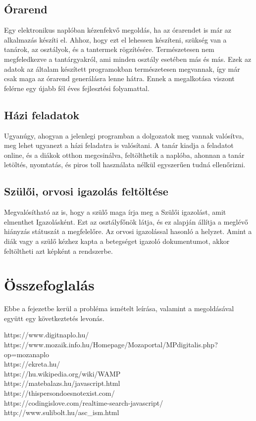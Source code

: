 \documentclass[
]{thesis-ekf}
\begin{document}
\section{Órarend}
Egy elektronikus naplóban kézenfekvő megoldás, ha az órarendet is már az alkalmazás készíti el. Ahhoz, hogy ezt el lehessen készíteni, szükség van a tanárok, az osztályok, és a tantermek rögzítésére. Természetesen nem megfeledkezve a tantárgyakról, ami minden osztály esetében más és más. Ezek az adatok az általam készített programokban természetesen megvannak, így már csak maga az órarend generálásra lenne hátra. Ennek a megalkotása viszont felérne egy újabb fél éves fejlesztési folyamattal.
\section{Házi feladatok}
Ugyanúgy, ahogyan a jelenlegi programban a dolgozatok meg vannak valósítva, meg lehet ugyanezt a házi feladatra is valósítani. A  tanár kiadja a feladatot online, és a diákok otthon megcsinálva, feltölthetik a naplóba, ahonnan a tanár letöltés, nyomtatás, és piros toll használata nélkül egyszerűen tudná ellenőrizni. 
\section{Szülői, orvosi igazolás feltöltése}
Megvalósítható az is, hogy a szülő maga írja meg a Szülői igazolást, amit elmenthet Igazolásként. Ezt az osztályfőnök látja, és ez alapján állítja a meglévő hiányzás státuszát a megfelelőre. Az orvosi igazolással hasonló a helyzet. Amint a diák vagy a szülő kézhez kapta a betegséget igazoló dokumentumot, akkor feltöltheti azt képként a rendszerbe.
\chapter{Összefoglalás}
Ebbe a fejezetbe kerül a probléma ismételt leírása, valamint a megoldásával együtt egy következtetés levonás.
\begin{thebibliography}{}
	https://www.digitnaplo.hu/\\
	https://www.mozaik.info.hu/Homepage/Mozaportal/MPdigitalis.php?op=mozanaplo\\
	https://ekreta.hu/\\
	https://hu.wikipedia.org/wiki/WAMP\\
	https://matebalazs.hu/javascript.html\\
	https://thispersondoesnotexist.com/ \\
	https://codingislove.com/realtime-search-javascript/\\
	http://www.sulibolt.hu/asc\_ism.html
\end{thebibliography}
\end{document}
